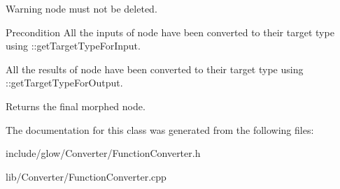 \begin{DoxyWarning}{Warning}
{\ttfamily node} must not be deleted.
\end{DoxyWarning}
\begin{DoxyPrecond}{Precondition}
All the inputs of {\ttfamily node} have been converted to their target type using \+::get\+Target\+Type\+For\+Input. 

All the results of {\ttfamily node} have been converted to their target type using \+::get\+Target\+Type\+For\+Output.
\end{DoxyPrecond}
\begin{DoxyReturn}{Returns}
the final morphed node. 
\end{DoxyReturn}


The documentation for this class was generated from the following files\+:\begin{DoxyCompactItemize}
\item 
include/glow/\+Converter/Function\+Converter.\+h\item 
lib/\+Converter/Function\+Converter.\+cpp\end{DoxyCompactItemize}

